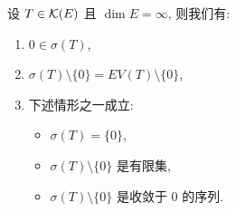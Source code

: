 \begin{keytheorem}
\label{thm:6.8}
设 $T\in\mathcal{K}(E)$ 且 $\dim E=\infty$, 则我们有:
\begin{enumerate}[label=(\alph*), leftmargin=2.2em, itemsep=0.1em]
	\item $0\in\sigma(T)$,
	\item $\sigma(T)\setminus\{0\}=EV(T)\setminus\{0\}$,
	\item 下述情形之一成立:
	      \begin{itemize}[leftmargin=1.6em, itemsep=0.15em]
	      	\item $\sigma(T)=\{0\}$,
	      	\item $\sigma(T)\setminus\{0\}$ 是有限集,
	      	\item $\sigma(T)\setminus\{0\}$ 是收敛于 $0$ 的序列.
	      \end{itemize}
\end{enumerate}
\end{keytheorem}

